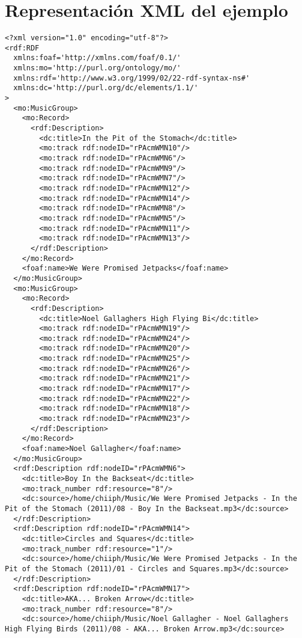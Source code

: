 \documentclass[a4paper,oneside]{report}
\begin{document}
\chapter{Representación XML del ejemplo}\label{ejemploXML}
\begin{lstlisting}
<?xml version="1.0" encoding="utf-8"?>
<rdf:RDF
  xmlns:foaf='http://xmlns.com/foaf/0.1/'
  xmlns:mo='http://purl.org/ontology/mo/'
  xmlns:rdf='http://www.w3.org/1999/02/22-rdf-syntax-ns#'
  xmlns:dc='http://purl.org/dc/elements/1.1/'
>
  <mo:MusicGroup>
    <mo:Record>
      <rdf:Description>
        <dc:title>In the Pit of the Stomach</dc:title>
        <mo:track rdf:nodeID="rPAcmWMN10"/>
        <mo:track rdf:nodeID="rPAcmWMN6"/>
        <mo:track rdf:nodeID="rPAcmWMN9"/>
        <mo:track rdf:nodeID="rPAcmWMN7"/>
        <mo:track rdf:nodeID="rPAcmWMN12"/>
        <mo:track rdf:nodeID="rPAcmWMN14"/>
        <mo:track rdf:nodeID="rPAcmWMN8"/>
        <mo:track rdf:nodeID="rPAcmWMN5"/>
        <mo:track rdf:nodeID="rPAcmWMN11"/>
        <mo:track rdf:nodeID="rPAcmWMN13"/>
      </rdf:Description>
    </mo:Record>
    <foaf:name>We Were Promised Jetpacks</foaf:name>
  </mo:MusicGroup>
  <mo:MusicGroup>
    <mo:Record>
      <rdf:Description>
        <dc:title>Noel Gallaghers High Flying Bi</dc:title>
        <mo:track rdf:nodeID="rPAcmWMN19"/>
        <mo:track rdf:nodeID="rPAcmWMN24"/>
        <mo:track rdf:nodeID="rPAcmWMN20"/>
        <mo:track rdf:nodeID="rPAcmWMN25"/>
        <mo:track rdf:nodeID="rPAcmWMN26"/>
        <mo:track rdf:nodeID="rPAcmWMN21"/>
        <mo:track rdf:nodeID="rPAcmWMN17"/>
        <mo:track rdf:nodeID="rPAcmWMN22"/>
        <mo:track rdf:nodeID="rPAcmWMN18"/>
        <mo:track rdf:nodeID="rPAcmWMN23"/>
      </rdf:Description>
    </mo:Record>
    <foaf:name>Noel Gallagher</foaf:name>
  </mo:MusicGroup>
  <rdf:Description rdf:nodeID="rPAcmWMN6">
    <dc:title>Boy In the Backseat</dc:title>
    <mo:track_number rdf:resource="8"/>
    <dc:source>/home/chiiph/Music/We Were Promised Jetpacks - In the Pit of the Stomach (2011)/08 - Boy In the Backseat.mp3</dc:source>
  </rdf:Description>
  <rdf:Description rdf:nodeID="rPAcmWMN14">
    <dc:title>Circles and Squares</dc:title>
    <mo:track_number rdf:resource="1"/>
    <dc:source>/home/chiiph/Music/We Were Promised Jetpacks - In the Pit of the Stomach (2011)/01 - Circles and Squares.mp3</dc:source>
  </rdf:Description>
  <rdf:Description rdf:nodeID="rPAcmWMN17">
    <dc:title>AKA... Broken Arrow</dc:title>
    <mo:track_number rdf:resource="8"/>
    <dc:source>/home/chiiph/Music/Noel Gallagher - Noel Gallaghers High Flying Birds (2011)/08 - AKA... Broken Arrow.mp3</dc:source>

\end{lstlisting}
\end{document}
